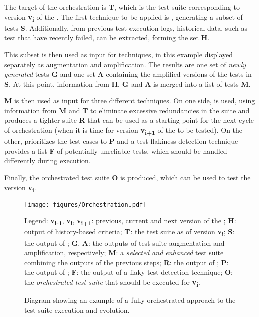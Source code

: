 The target of the orchestration is \textbf{T}, which is the test suite corresponding to version \textbf{v\textsubscript{i}} of the \sut.
The first technique to be applied is \tcs, generating a subset of tests \textbf{S}.
Additionally, from previous test execution logs, historical data, such as test that have recently failed, can be extracted, forming the set \textbf{H}.

This subset is then used as input for \tsa techniques, in this example displayed separately as augmentation and amplification.
The results are one set of \textit{newly generated} tests \textbf{G} and one set \textbf{A} containing the amplified versions of the tests in \textbf{S}.
At this point, information from \textbf{H}, \textbf{G} and \textbf{A} is merged into a list of tests \textbf{M}.

\textbf{M} is then used as input for three different techniques.
On one side, \tsr is used, using information from \textbf{M} and \textbf{T} to eliminate excessive redundancies in the suite and produces a tighter suite \textbf{R} that can be used as a starting point for the next cycle of orchestration (when it is time for version \textbf{v\textsubscript{i+1}} of the \sut to be tested).
On the other, \tcp prioritizes the test cases to \textbf{P} and a test flakiness detection technique provides a list \textbf{F} of potentially unreliable tests, which should be handled differently during execution.

Finally, the orchestrated test suite \textbf{O} is produced, which can be used to test the \sut version \textbf{v\textsubscript{i}}.


\begin{figure*}[h]
  \centering
  \texttt{[image: figures/Orchestration.pdf]}
  \begin{flushleft}
	\footnotesize Legend: 
	\textbf{v\textsubscript{i-1}}, \textbf{v\textsubscript{i}}, \textbf{v\textsubscript{i+1}}: previous, current and next version of the \sut; 
	\textbf{H}: output of history-based criteria;
	\textbf{T}: the test suite as of version \textbf{v\textsubscript{i}};
	\textbf{S}: the output of \tcs;
	\textbf{G}, \textbf{A}: the outputs of test suite augmentation and amplification, respectively;
	\textbf{M}: a \textit{selected and enhanced} test suite combining the outputs of the previous steps;
	\textbf{R}: the output of \tsr;
	\textbf{P}: the output of \tcp;
	\textbf{F}: the output of a flaky test detection technique;
	\textbf{O}: the \textit{orchestrated test suite} that should be executed for \textbf{v\textsubscript{i}}.
  \end{flushleft}
  \caption{Diagram showing an example of a fully orchestrated approach to the test suite execution and evolution.}
  \label{fig:orchestration}
\end{figure*}

